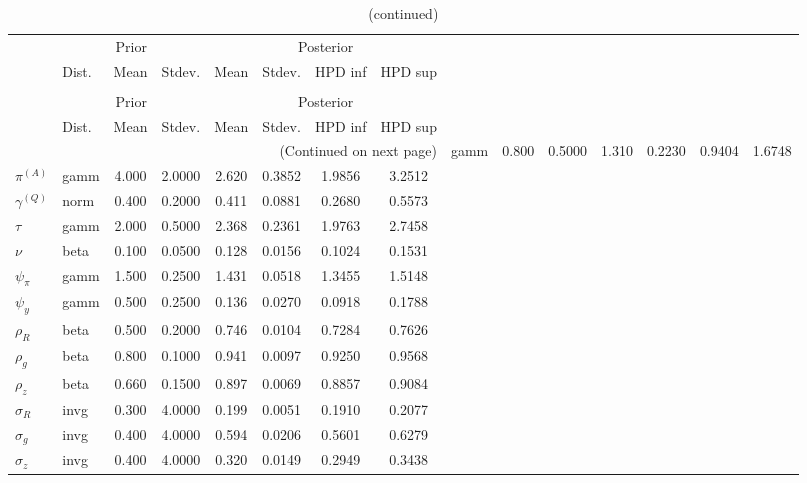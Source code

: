  
\begin{center}
\begin{longtable}{llcccccc} 
\caption{Results from Metropolis-Hastings (parameters)}
 \label{Table:MHPosterior:1}\\
\toprule 
  & \multicolumn{3}{c}{Prior}  &  \multicolumn{4}{c}{Posterior} \\
  \cmidrule(r{.75em}){2-4} \cmidrule(r{.75em}){5-8}
  & Dist. & Mean  & Stdev. & Mean & Stdev. & HPD inf & HPD sup\\
\midrule \endfirsthead 
\caption{(continued)}\\\toprule 
  & \multicolumn{3}{c}{Prior}  &  \multicolumn{4}{c}{Posterior} \\
  \cmidrule(r{.75em}){2-4} \cmidrule(r{.75em}){5-8}
  & Dist. & Mean  & Stdev. & Mean & Stdev. & HPD inf & HPD sup\\
\midrule \endhead 
\bottomrule \multicolumn{8}{r}{(Continued on next page)} \endfoot 
\bottomrule \endlastfoot 
${r_{A}}$ & gamm &   0.800 & 0.5000 &   1.310& 0.2230 &  0.9404 &  1.6748 \\ 
${\pi^{(A)}}$ & gamm &   4.000 & 2.0000 &   2.620& 0.3852 &  1.9856 &  3.2512 \\ 
${\gamma^{(Q)}}$ & norm &   0.400 & 0.2000 &   0.411& 0.0881 &  0.2680 &  0.5573 \\ 
${\tau}$ & gamm &   2.000 & 0.5000 &   2.368& 0.2361 &  1.9763 &  2.7458 \\ 
${\nu}$ & beta &   0.100 & 0.0500 &   0.128& 0.0156 &  0.1024 &  0.1531 \\ 
${\psi_\pi}$ & gamm &   1.500 & 0.2500 &   1.431& 0.0518 &  1.3455 &  1.5148 \\ 
${\psi_y}$ & gamm &   0.500 & 0.2500 &   0.136& 0.0270 &  0.0918 &  0.1788 \\ 
${\rho_R}$ & beta &   0.500 & 0.2000 &   0.746& 0.0104 &  0.7284 &  0.7626 \\ 
${\rho_{g}}$ & beta &   0.800 & 0.1000 &   0.941& 0.0097 &  0.9250 &  0.9568 \\ 
${\rho_z}$ & beta &   0.660 & 0.1500 &   0.897& 0.0069 &  0.8857 &  0.9084 \\ 
${\sigma_R}$ & invg &   0.300 & 4.0000 &   0.199& 0.0051 &  0.1910 &  0.2077 \\ 
${\sigma_{g}}$ & invg &   0.400 & 4.0000 &   0.594& 0.0206 &  0.5601 &  0.6279 \\ 
${\sigma_z}$ & invg &   0.400 & 4.0000 &   0.320& 0.0149 &  0.2949 &  0.3438 \\ 
\end{longtable}
 \end{center}
